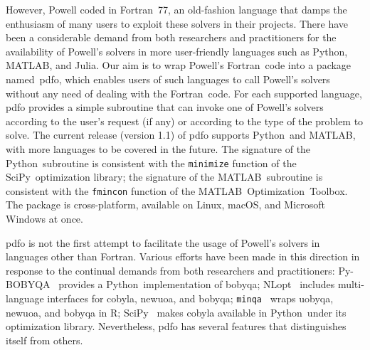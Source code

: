 \documentclass[11pt,draft]{article}
\numberwithin{equation}{section}
\def\fortran{\mbox{Fortran}}
\def\julia{\mbox{Julia}}
\def\matlab{\mbox{MATLAB}}
\def\matlabopt{\mbox{\matlab\ Optimization Toolbox\textsuperscript{\texttrademark}}}
\def\minqa{\mbox{\texttt{minqa}}}
\def\nlopt{\mbox{NLopt}}
\def\pybobyqa{\mbox{Py-BOBYQA}}
\def\python{\mbox{Python}}
\def\rlang{\mbox{R}}
\def\scipy{\mbox{SciPy}}
\begin{document}
However, Powell coded in \fortran\ 77, an old-fashion language that damps the enthusiasm of many users to exploit these solvers in their projects.
There have been a considerable demand from both researchers and practitioners for the availability of Powell's solvers in more user-friendly languages such as \python, \matlab, and \julia.
Our aim is to wrap Powell's \fortran\ code into a package named~\gls{pdfo}, which enables users of such languages to call Powell's solvers without any need of dealing with the \fortran\ code.
For each supported language, \gls{pdfo} provides a simple subroutine that can invoke one of Powell's solvers according to the user's request (if any) or according to the type of the problem to solve. The current release (version 1.1) of \gls{pdfo} supports \python\ and \matlab, with more languages to be covered in the future.
The signature of the \python\ subroutine is consistent with the \texttt{minimize} function of the \scipy\ optimization library;
the signature of the \matlab\ subroutine is consistent with the \texttt{fmincon} function of the \matlabopt.
The package is cross-platform, available on Linux, macOS, and Microsoft Windows at once.

\gls{pdfo} is not the first attempt to facilitate the usage of Powell's solvers in languages other than \fortran.
Various efforts have been made in this direction in response to the continual demands from both researchers and practitioners: \pybobyqa~\cite{Cartis_Etal_2019} provides a \python\ implementation of \gls{bobyqa}; \nlopt~\cite{Johnson_2019} includes multi-language interfaces for \gls{cobyla}, \gls{newuoa}, and \gls{bobyqa}; \minqa~\cite{Bates_Etal_2014} wraps \gls{uobyqa}, \gls{newuoa}, and \gls{bobyqa} in \rlang; \scipy~\cite{Virtanen_Etal_2020} makes \gls{cobyla} available in \python\ under its optimization library. Nevertheless, \gls{pdfo} has several features that distinguishes itself from others.
\end{document}
